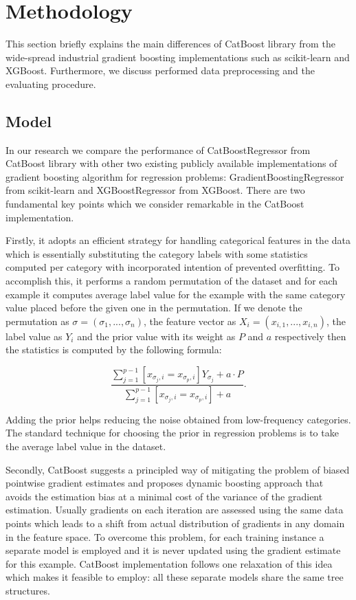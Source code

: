 \section{Methodology}
\label{sec:methodology}

This section briefly explains the main differences of CatBoost library from the wide-spread industrial gradient boosting implementations such as scikit-learn and XGBoost. Furthermore, we discuss performed data preprocessing and the evaluating procedure.

\subsection{Model}

In our research we compare the performance of CatBoostRegressor from CatBoost library with other two existing publicly available implementations of gradient boosting algorithm for regression problems: GradientBoostingRegressor from scikit-learn and XGBoostRegressor from XGBoost. There are two fundamental key points which we consider remarkable in the CatBoost implementation.

Firstly, it adopts an efficient strategy for handling categorical features in the data which is essentially substituting the category labels with some statistics computed per category with incorporated intention of prevented overfitting. To accomplish this, it performs a random permutation of the dataset and for each example it computes average label value for the example with the same category value placed before the given one in the permutation. 
If we denote the permutation as $ \sigma = (\sigma_1, ..., \sigma_n)$, the feature vector as $ X_i = (x_{i, 1}, ..., x_{i, n})$, the label value as $Y_i$ and the prior value with its weight as $P$ and $a$ respectively then the statistics is computed by the following formula:

$$ \frac{\sum_{j=1}^{p-1} [ x_{\sigma_j, i} = x_{\sigma_p, i}] Y_{\sigma_j} + a \cdot P}{\sum_{j=1}^{p-1} [ x_{\sigma_j, i} = x_{\sigma_p, i}] + a }. $$

Adding the prior helps reducing the noise obtained from low-frequency categories. The standard technique for choosing the prior in regression problems is to take the average label value in the dataset.

Secondly, CatBoost suggests a principled way of mitigating the problem of biased pointwise gradient estimates and proposes dynamic boosting approach that avoids the estimation bias at a minimal cost of the variance of the gradient estimation. Usually gradients on each iteration are assessed using the same data points which leads to a shift from actual distribution of gradients in any domain in the feature space. To overcome this problem, for each training instance a separate model is employed and it is never updated using the gradient estimate for this example. CatBoost implementation follows one relaxation of this idea which makes it feasible to employ: all these separate models share the same tree structures.

